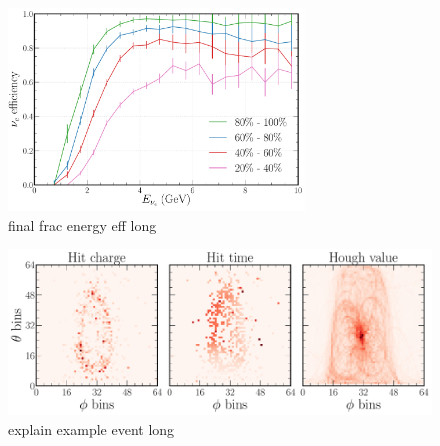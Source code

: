 \begin{figure} %
    \includegraphics[width=0.7\textwidth]{diagrams/6-cvn/chipsnet/final_frac_energy_eff.pdf}
    \caption[final frac energy eff short]
    {final frac energy eff long}
    \label{fig:final_frac_energy_eff}
\end{figure}

\begin{figure} %
    \includegraphics[width=\textwidth]{diagrams/6-cvn/chipsnet/explain_example_event.pdf}
    \caption[explain example event short]
    {explain example event long}
    \label{fig:explain_example_event}
\end{figure}

